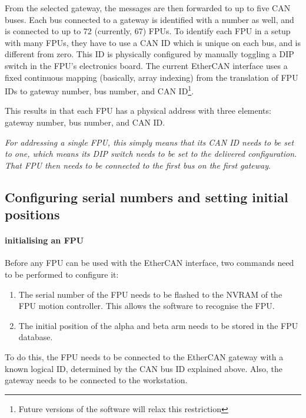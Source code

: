 \documentclass[11pt,a4paper]{report}
\begin{document}
From the selected gateway, the messages are then forwarded to up to
five CAN buses. Each bus connected to a gateway is identified with a
number as well, and is connected to up to 72 (currently, 67) FPUs.
 To identify each FPU in a setup with many FPUs,
they have to use a CAN ID which is unique on each bus, and is
different from zero. This ID is physically configured by manually
toggling a DIP switch in the FPU's electronics board. The current
EtherCAN interface uses a fixed continuous mapping (basically, array indexing)
from the translation of FPU IDs to gateway number, bus number, and CAN
ID\footnote{Future versions of the software will relax this
  restriction}.

This results in that each FPU has a physical address with three
elements: gateway number, bus number, and CAN ID.

\emph{For addressing a single FPU, this simply means that its CAN ID
  needs to be set to one, which means its DIP switch needs to be set
  to the delivered configuration. That FPU then needs to be connected
  to the first bus on the first gateway}.


\subsection{Configuring serial numbers and setting initial positions}
\label{sec:setinitialposition}

\paragraph{initialising an FPU}

Before any FPU can be used with the EtherCAN interface, two commands
need to be performed to configure it:

\begin{enumerate}
\item The serial number of the FPU needs to be flashed to the
  NVRAM of the FPU motion controller. This allows the software
  to recognise the FPU.
\item The initial position of the alpha and beta arm needs to
  be stored in the FPU database.
\end{enumerate}

To do this, the FPU needs to be connected to the EtherCAN gateway with
a known logical ID, determined by the CAN bus ID explained
above. Also, the gateway needs to be connected to the workstation.
\end{document}

